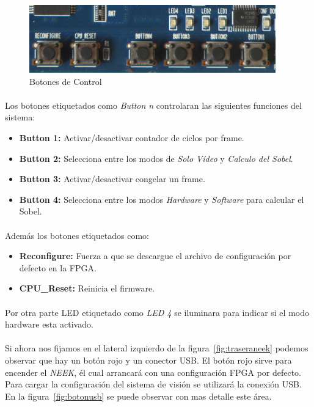 \documentclass[a4paper,12pt,titlepage,final]{book}
\begin{document}
\begin{figure}[p]
\centering
\includegraphics[width=0.95\textwidth]{./figuras/NEEK/BotonesSetup.png}
\caption{Botones de Control}
\label{fig:botonescontrol}
\end{figure}

\clearpage

\paragraph{}
Los botones etiquetados como \textit{Button n} controlaran las siguientes funciones del sistema:
\begin{itemize}
\item \textbf{Button 1:} Activar/desactivar contador de ciclos por frame.
\item \textbf{Button 2:} Selecciona entre los modos de \textit{Solo Vídeo} y \textit{Calculo del Sobel}.
\item \textbf{Button 3:} Activar/desactivar congelar un frame.
\item \textbf{Button 4:} Selecciona entre los modos \textit{Hardware} y \textit{Software} para calcular el Sobel. 
\end{itemize}

\paragraph{}
Además los botones etiquetados como:
\begin{itemize}
\item \textbf{Reconfigure:} Fuerza a que se descargue el archivo de configuración por defecto en la FPGA. 
\item \textbf{CPU\_Reset:} Reinicia el firmware.
\end{itemize}

\paragraph{}
Por otra parte LED etiquetado como \textit{LED 4} se iluminara para indicar si el modo hardware esta activado. 

\paragraph{}
Si ahora nos fijamos en el lateral izquierdo de la figura~\ref{fig:traseraneek} podemos observar que hay un botón rojo y un conector USB. El botón rojo sirve para encender el \textit{NEEK}, él cual arrancará con una configuración FPGA por defecto. Para cargar la configuración del sistema de visión se utilizará la conexión USB. En la figura~\ref{fig:botonusb} se puede observar con mas detalle este área.
\end{document}
